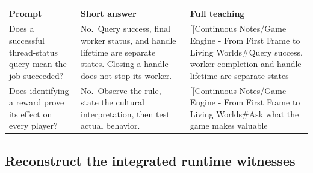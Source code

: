 {\def\LTcaptype{none} %
\begin{longtable}[]{@{}
  >{\raggedright\arraybackslash}p{}
  >{\raggedright\arraybackslash}p{}
  >{\raggedright\arraybackslash}p{}@{}}
\toprule\noalign{}
\begin{minipage}[b]{\linewidth}\raggedright
Prompt
\end{minipage} & \begin{minipage}[b]{\linewidth}\raggedright
Short answer
\end{minipage} & \begin{minipage}[b]{\linewidth}\raggedright
Full teaching
\end{minipage} \\
\midrule\noalign{}
\endhead
\bottomrule\noalign{}
\endlastfoot
Does a successful thread-status query mean the job succeeded? & No.~Query success, final worker status, and handle lifetime are separate states. Closing a handle does not stop its worker. & {[}{[}Continuous Notes/Game Engine - From First Frame to Living Worlds\#Query success, worker completion and handle lifetime are separate states \\
Does identifying a reward prove its effect on every player? & No.~Observe the rule, state the cultural interpretation, then test actual behavior. & {[}{[}Continuous Notes/Game Engine - From First Frame to Living Worlds\#Ask what the game makes valuable \\
\end{longtable}
}

\subsection{Reconstruct the integrated runtime witnesses}\label{appendix-64ea716dcadc-reconstruct-the-integrated-runtime-witnesses}

